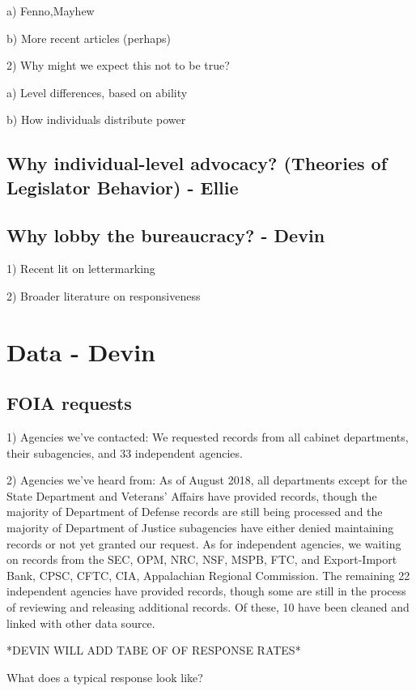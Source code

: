 \documentclass[]{article}
\begin{document}
a) Fenno,Mayhew

b) More recent articles (perhaps)

2) Why might we expect this not to be true?

a) Level differences, based on ability

b) How individuals distribute power

\subsection{Why individual-level advocacy? (Theories of Legislator Behavior) - Ellie}

\subsection{Why lobby the bureaucracy? - Devin}

1) Recent lit on lettermarking

2) Broader literature on responsiveness


\section{Data - Devin }

\subsection{FOIA requests}


1) Agencies we've contacted:
We requested records from all cabinet departments, their subagencies, and 33 independent agencies. 

2) Agencies we've heard from:
As of August 2018, all departments except for the State Department and Veterans' Affairs have provided records, though the majority of Department of Defense records are still being processed and the majority of Department of Justice subagencies have either denied maintaining records or not yet granted our request. 
As for independent agencies, we waiting on records from the SEC, OPM, NRC, NSF, MSPB, FTC, and Export-Import Bank, CPSC, CFTC, CIA, Appalachian Regional Commission. The remaining 22 independent agencies have provided records, though some are still in the process of reviewing and releasing additional records. Of these, 10 have been cleaned and linked with other data source. 

*DEVIN WILL ADD TABE OF OF RESPONSE RATES*

What does a typical response look like? 
\end{document}
